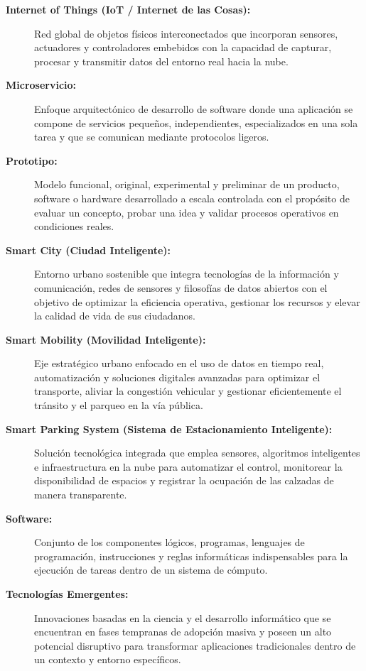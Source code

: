\documentclass[12pt,a4paper]{article}
\begin{document}
\begin{description}
	\item[\textbf{Internet of Things (IoT / Internet de las Cosas):}] Red global de objetos físicos interconectados que incorporan sensores, actuadores y controladores embebidos con la capacidad de capturar, procesar y transmitir datos del entorno real hacia la nube.
	
	\item[\textbf{Microservicio:}] Enfoque arquitectónico de desarrollo de software donde una aplicación se compone de servicios pequeños, independientes, especializados en una sola tarea y que se comunican mediante protocolos ligeros.
	
	\item[\textbf{Prototipo:}] Modelo funcional, original, experimental y preliminar de un producto, software o hardware desarrollado a escala controlada con el propósito de evaluar un concepto, probar una idea y validar procesos operativos en condiciones reales.
	
	\item[\textbf{Smart City (Ciudad Inteligente):}] Entorno urbano sostenible que integra tecnologías de la información y comunicación, redes de sensores y filosofías de datos abiertos con el objetivo de optimizar la eficiencia operativa, gestionar los recursos y elevar la calidad de vida de sus ciudadanos.
	
	\item[\textbf{Smart Mobility (Movilidad Inteligente):}] Eje estratégico urbano enfocado en el uso de datos en tiempo real, automatización y soluciones digitales avanzadas para optimizar el transporte, aliviar la congestión vehicular y gestionar eficientemente el tránsito y el parqueo en la vía pública.
	
	\item[\textbf{Smart Parking System (Sistema de Estacionamiento Inteligente):}] Solución tecnológica integrada que emplea sensores, algoritmos inteligentes e infraestructura en la nube para automatizar el control, monitorear la disponibilidad de espacios y registrar la ocupación de las calzadas de manera transparente.
	
	\item[\textbf{Software:}] Conjunto de los componentes lógicos, programas, lenguajes de programación, instrucciones y reglas informáticas indispensables para la ejecución de tareas dentro de un sistema de cómputo.
	
	\item[\textbf{Tecnologías Emergentes:}] Innovaciones basadas en la ciencia y el desarrollo informático que se encuentran en fases tempranas de adopción masiva y poseen un alto potencial disruptivo para transformar aplicaciones tradicionales dentro de un contexto y entorno específicos.
\end{description}
\end{document}
